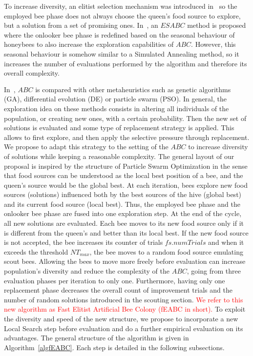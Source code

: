 \documentclass[sn-mathphys]{sn-jnl}%
\theoremstyle{thmstyleone}%
\theoremstyle{thmstyletwo}%
\theoremstyle{thmstylethree}%
\newcommand{\review}[1]{\textcolor{red}{#1}} %
\begin{document}
To increase diversity, an elitist selection mechanism was introduced in~\cite{Diaz2022} so the employed bee phase does not always choose the queen's food source to explore, but a solution from a set of promising ones. In~\cite{Diaz2023-ICAE}, an $ESABC$ method is proposed where the onlooker bee phase is redefined based on the seasonal behaviour of honeybees to also increase the exploration capabilities of $ABC$. However, this seasonal behaviour is somehow similar to a Simulated Annealing method, so it increases the number of evaluations performed by the algorithm and therefore its overall complexity.

In~\cite{Karaboga2009}, $ABC$ is compared with other metaheuristics such as genetic algorithms (GA), differential evolution (DE) or particle swarm (PSO). In general, the exploration idea on these methods consists in altering all individuals of the population, or creating new ones, with a certain probability. Then the new set of solutions is evaluated and some type of replacement strategy is applied. This allows to first explore, and then apply the selective pressure through replacement. We propose to adapt this strategy to the setting of the $ABC$ to increase diversity of solutions while keeping a reasonable complexity. The general layout of our proposal is inspired by the structure of Particle Swarm Optimization \cite{Kennedy1995} in the sense that food sources can be understood as the local best position of a bee, and the queen's source would be the global best. At each iteration, bees explore new food sources (solutions) influenced both by the best sources of the hive (global best) and its current food source (local best). Thus, the employed bee phase and the onlooker bee phase are fused into one exploration step. At the end of the cycle, all new solutions are evaluated. Each bee moves to its new food source only if it is different from the queen's and better than its local best. If the new food source is not accepted, the bee increases its counter of trials $fs.numTrials$ and when it exceeds the threshold $NT_{max}$, the bee moves to a random food source emulating scout bees. Allowing the bees to move more freely before evaluation can increase population's diversity and reduce the complexity of the $ABC$, going from three evaluation phases per iteration to only one. Furthermore, having only one replacement phase decreases the overall count of improvement trials and the number of random solutions introduced in the scouting section. \review{We refer to this new algorithm as Fast Elitist Artificial Bee Colony (fEABC in short).} To exploit the diversity and speed of the new structure, we propose to incorporate a new Local Search step before evaluation and do a further empirical evaluation on its advantages. The general structure of the algorithm is given in Algorithm~\ref{algfEABC}. Each step is detailed in the following subsections.
\end{document}
